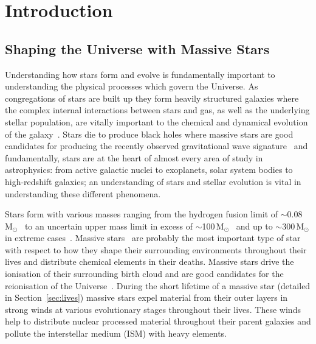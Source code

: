 \chapter{Introduction}\label{ch:intro}

\section{Shaping the Universe with Massive Stars} %
\label{sec:massive_stars}
Understanding how stars form and evolve is fundamentally important to understanding the physical processes which govern the Universe.
As congregations of stars are built up they form heavily structured galaxies where the complex internal interactions between stars and gas, as well as the underlying stellar population, are vitally important to the chemical and dynamical evolution of the galaxy~\citep[e.g.][]{2014ARA&A..52..291C}.
Stars die to produce black holes where massive stars are good candidates for producing the recently observed gravitational wave signature~\citep{2016PhRvL.116f1102A,2016arXiv160204735L,2016arXiv160300511W} and fundamentally, stars are at the heart of almost every area of study in astrophysics: from active galactic nuclei to exoplanets, solar system bodies to high-redshift galaxies; an understanding of stars and stellar evolution is vital in understanding these different phenomena.

Stars form with various masses ranging from the hydrogen fusion limit of $\sim$0.08\,M$_{\odot}$~\citep{1997ApJ...491..856B,2000ARA&A..38..337C} to an uncertain upper mass limit in excess of $\sim$100\,M$_{\odot}$~\citep[e.g.][]{2005Natur.434..192F,2012MNRAS.422..794E,2014A&A...568L..13W} and up to $\sim$300\,M$_{\odot}$ in extreme cases~\citep{2010MNRAS.408..731C}.
Massive stars~\citep[defined here as stars with initial masses $>$8\,M$_{\odot}$ e.g.][and expanded upon in Section~\ref{sec:lives}]{2014ARA&A..52..487S} are probably the most important type of star with respect to how they shape their surrounding environments throughout their lives and distribute chemical elements in their deaths.
Massive stars drive the ionisation of their surrounding birth cloud and are good candidates for the reionisation of the Universe~\citep[e.g.][]{1997ApJ...483...21H,2005SSRv..116..625C,2006ARA&A..44..415F}.
During the short lifetime of a massive star (detailed in Section~\ref{sec:lives}) massive stars expel material from their outer layers in strong winds at various evolutionary stages throughout their lives.
These winds help to distribute nuclear processed material throughout their parent galaxies and pollute the interstellar medium (ISM) with heavy elements.

